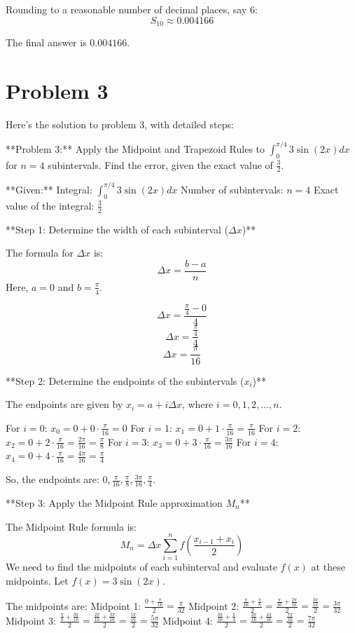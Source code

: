 \documentclass{article}
\begin{document}
Rounding to a reasonable number of decimal places, say 6:
$$ S_{10} \approx 0.004166 $$

The final answer is $\boxed{0.004166}$.

\newpage

\section*{Problem 3}
Here's the solution to problem 3, with detailed steps:

**Problem 3:** Apply the Midpoint and Trapezoid Rules to $\int_{0}^{\pi/4} 3\sin(2x) dx$ for $n=4$ subintervals. Find the error, given the exact value of $\frac{3}{2}$.

**Given:**
Integral: $\int_{0}^{\pi/4} 3\sin(2x) dx$
Number of subintervals: $n=4$
Exact value of the integral: $\frac{3}{2}$

**Step 1: Determine the width of each subinterval ($\Delta x$)**

The formula for $\Delta x$ is:
$$ \Delta x = \frac{b - a}{n} $$
Here, $a=0$ and $b=\frac{\pi}{4}$.

$$ \Delta x = \frac{\frac{\pi}{4} - 0}{4} $$
$$ \Delta x = \frac{\frac{\pi}{4}}{4} $$
$$ \Delta x = \frac{\pi}{16} $$

**Step 2: Determine the endpoints of the subintervals ($x_i$)**

The endpoints are given by $x_i = a + i \Delta x$, where $i = 0, 1, 2, \dots, n$.

For $i=0$: $x_0 = 0 + 0 \cdot \frac{\pi}{16} = 0$
For $i=1$: $x_1 = 0 + 1 \cdot \frac{\pi}{16} = \frac{\pi}{16}$
For $i=2$: $x_2 = 0 + 2 \cdot \frac{\pi}{16} = \frac{2\pi}{16} = \frac{\pi}{8}$
For $i=3$: $x_3 = 0 + 3 \cdot \frac{\pi}{16} = \frac{3\pi}{16}$
For $i=4$: $x_4 = 0 + 4 \cdot \frac{\pi}{16} = \frac{4\pi}{16} = \frac{\pi}{4}$

So, the endpoints are: $0, \frac{\pi}{16}, \frac{\pi}{8}, \frac{3\pi}{16}, \frac{\pi}{4}$.

**Step 3: Apply the Midpoint Rule approximation $M_n$**

The Midpoint Rule formula is:
$$ M_n = \Delta x \sum_{i=1}^{n} f\left(\frac{x_{i-1} + x_i}{2}\right) $$
We need to find the midpoints of each subinterval and evaluate $f(x)$ at these midpoints. Let $f(x) = 3\sin(2x)$.

The midpoints are:
Midpoint 1: $\frac{0 + \frac{\pi}{16}}{2} = \frac{\pi}{32}$
Midpoint 2: $\frac{\frac{\pi}{16} + \frac{\pi}{8}}{2} = \frac{\frac{\pi}{16} + \frac{2\pi}{16}}{2} = \frac{\frac{3\pi}{16}}{2} = \frac{3\pi}{32}$
Midpoint 3: $\frac{\frac{\pi}{8} + \frac{3\pi}{16}}{2} = \frac{\frac{2\pi}{16} + \frac{3\pi}{16}}{2} = \frac{\frac{5\pi}{16}}{2} = \frac{5\pi}{32}$
Midpoint 4: $\frac{\frac{3\pi}{16} + \frac{\pi}{4}}{2} = \frac{\frac{3\pi}{16} + \frac{4\pi}{16}}{2} = \frac{\frac{7\pi}{16}}{2} = \frac{7\pi}{32}$
\end{document}
